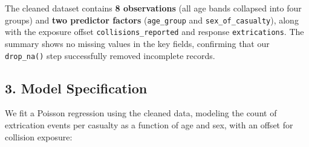 \documentclass[
]{article}
\begin{document}
The cleaned dataset contains \textbf{8 observations} (all age bands
collapsed into four groups) and \textbf{two predictor factors}
(\texttt{age\_group} and \texttt{sex\_of\_casualty}), along with the
exposure offset \texttt{collisions\_reported} and response
\texttt{extrications}. The summary shows no missing values in the key
fields, confirming that our \texttt{drop\_na()} step successfully
removed incomplete records.

\subsection{3. Model Specification}\label{model-specification}

We fit a Poisson regression using the cleaned data, modeling the count
of extrication events per casualty as a function of age and sex, with an
offset for collision exposure:
\end{document}
